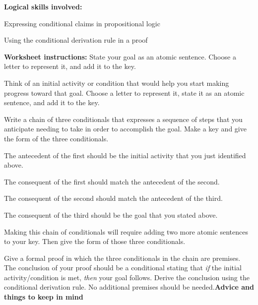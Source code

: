 \documentclass[oneside, openany]{book} %
\begin{document}
\noindent 

\noindent \textbf{Logical skills involved:}

\noindent 

\noindent  Expressing conditional claims in propositional logic

\noindent 

\noindent  Using the conditional derivation rule in a proof

\noindent 

\noindent 

\noindent \textbf{Worksheet instructions: }State your goal as an atomic sentence. Choose a letter to represent it, and add it to the key.

\noindent 

\noindent Think of an initial activity or condition that would help you start making progress toward that goal. Choose a letter to represent it, state it as an atomic sentence, and add it to the key.

\noindent 

\noindent Write a chain of three conditionals that expresses a sequence of steps that you anticipate needing to take in order to accomplish the goal. Make a key and give the form of the three conditionals.

\noindent 

\noindent  The antecedent of the first should be the initial activity that you just identified above.

\noindent 

\noindent  The consequent of the first should match the antecedent of the second.

\noindent 

\noindent  The consequent of the second should match the antecedent of the third.

\noindent 

\noindent  The consequent of the third should be the goal that you stated above.

\noindent 

\noindent 

\noindent Making this chain of conditionals will require adding two more atomic sentences to your key. Then give the form of those three conditionals.

\noindent 

\noindent Give a formal proof in which the three conditionals in the chain are premises. The conclusion of your proof should be a conditional stating that \textit{if }the initial activity/condition is met, \textit{then }your goal follows. Derive the conclusion using the conditional derivation rule. No additional premises should be needed.\textbf{Advice and things to keep in mind}
\end{document}
